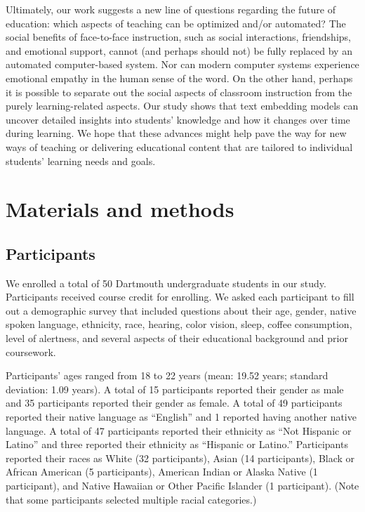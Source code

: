\documentclass[10pt]{article}
\begin{document}
Ultimately, our work suggests a new line of questions regarding the future of
education: which aspects of teaching can be optimized and/or automated? The
social benefits of face-to-face instruction, such as social interactions,
friendships, and emotional support, cannot (and perhaps should not) be fully
replaced by an automated computer-based system. Nor can modern computer systems
experience emotional empathy in the human sense of the word. On the other hand,
perhaps it is possible to separate out the social aspects of classroom
instruction from the purely learning-related aspects. Our study shows that text
embedding models can uncover detailed insights into students' knowledge and how
it changes over time during learning.  We hope that these advances might help
pave the way for new ways of teaching or delivering educational content
that are tailored to individual students' learning needs and goals.

\section*{Materials and methods}

\subsection*{Participants}

We enrolled a total of 50 Dartmouth undergraduate students in our study.
Participants received course credit for enrolling. We asked each participant to
fill out a demographic survey that included questions about their age, gender,
native spoken language, ethnicity, race, hearing, color vision, sleep, coffee
consumption, level of alertness, and several aspects of their educational
background and prior coursework.

Participants' ages ranged from 18 to 22 years (mean: 19.52 years;
standard deviation: 1.09 years). A total of 15 participants reported
their gender as male and 35 participants reported their gender as
female. A total of 49 participants reported their native language as
``English'' and 1 reported having another native language. A total of
47 participants reported their ethnicity as ``Not Hispanic or Latino''
and three reported their ethnicity as ``Hispanic or Latino.''
Participants reported their races as White (32 participants), Asian
(14 participants), Black or African American (5 participants),
American Indian or Alaska Native (1 participant), and Native Hawaiian or
Other Pacific Islander (1 participant). (Note that some participants
selected multiple racial categories.)
\end{document}

